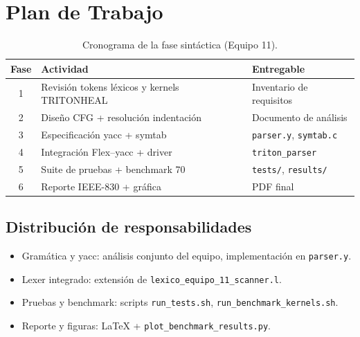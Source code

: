 \section{Plan de Trabajo}

\begin{table}[H]
\centering
\caption{Cronograma de la fase sintáctica (Equipo 11).}
\begin{tabular}{@{}cll@{}}
\toprule
Fase & Actividad & Entregable \\
\midrule
1 & Revisión tokens léxicos y kernels TRITONHEAL & Inventario de requisitos \\
2 & Diseño CFG + resolución indentación & Documento de análisis \\
3 & Especificación yacc + symtab & \texttt{parser.y}, \texttt{symtab.c} \\
4 & Integración Flex--yacc + driver & \texttt{triton\_parser} \\
5 & Suite de pruebas + benchmark 70 & \texttt{tests/}, \texttt{results/} \\
6 & Reporte IEEE-830 + gráfica & PDF final \\
\bottomrule
\end{tabular}
\end{table}

\subsection{Distribución de responsabilidades}
\begin{itemize}
  \item Gramática y yacc: análisis conjunto del equipo, implementación en \texttt{parser.y}.
  \item Lexer integrado: extensión de \texttt{lexico\_equipo\_11\_scanner.l}.
  \item Pruebas y benchmark: scripts \texttt{run\_tests.sh}, \texttt{run\_benchmark\_kernels.sh}.
  \item Reporte y figuras: \LaTeX{} + \texttt{plot\_benchmark\_results.py}.
\end{itemize}
